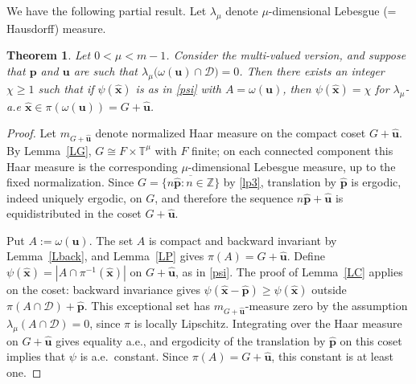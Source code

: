 \documentclass[11pt,reqno,tbtags,a4paper]{amsart}
\numberwithin{equation}{section}
\renewcommand\ge{\geq}
\renewcommand\geq{\geqslant}
\theoremstyle{plain}%
\newtheorem{theorem}{Theorem}[section]
\theoremstyle{definition}
\theoremstyle{remark}
\newcommand{\refL}[1]{Lemma~\ref{#1}}
\newcommand\bigpar[1]{\bigl(#1\bigr)}
\newcommand\punkt{\xperiod}    %
\newcommand{\aex}{a.e\punkt}
\newcommand\bbT{\mathbb T}
\newcommand\bbZ{\mathbb Z}
\newcommand\gl{\lambda}
\newcommand\cD{\mathcal D}
\newcommand\cL{{\omega}}
\newcommand\qw{^{-1}}
\newcommand\vp{\mathbf{p}}
\newcommand\hvp{\hat{\mathbf{p}}}
\newcommand\vu{\mathbf{u}}
\newcommand\hvu{{\hat{\mathbf{u}}}}
\newcommand\hvx{\hat{\mathbf{x}}}
\newcommand\0{{\boldsymbol 0}}
\newcommand\1{{\boldsymbol 1}}
\begin{document}
We have the following partial result.
Let $\gl_\mu$ denote $\mu$-dimensional Lebesgue (= Hausdorff) measure.
\begin{theorem}\label{Tmu}
Let $0<\mu<m-1$.
Consider the multi-valued version, and
  suppose that $\vp$ and $\vu$ are such that
$\gl_\mu\bigpar{\cL(\vu)\cap\cD}=0$.
Then there exists an integer $\chi\ge1$ such that if\/ $\psi(\hvx)$ is as in
\eqref{psi} with $A=\cL(\vu)$, then
$\psi(\hvx)=\chi$ for $\gl_\mu$-\aex{} $\hvx\in \pi(\cL(\vu))=G+\hvu$.
\end{theorem}
\begin{proof}
Let $m_{G+\hvu}$ denote normalized Haar measure on the compact coset
$G+\hvu$.  By \refL{LG}, $G\cong F\times\bbT^\mu$ with $F$ finite; on each
connected component this Haar measure is the corresponding $\mu$-dimensional
Lebesgue measure, up to the fixed normalization.  Since
$G=\overline{\{n\hvp:n\in\bbZ\}}$ by \eqref{lp3}, translation by $\hvp$ is
ergodic, indeed uniquely ergodic, on $G$, and therefore the sequence
$n\hvp+\hvu$ is equidistributed in the coset $G+\hvu$.

Put $A:=\cL(\vu)$.  The set $A$ is compact and backward invariant by
\refL{Lback}, and \refL{LP} gives $\pi(A)=G+\hvu$.  Define
$\psi(\hvx)=|A\cap\pi\qw(\hvx)|$ on $G+\hvu$, as in \eqref{psi}.  The proof of
\refL{LC} applies on the coset: backward invariance gives
$\psi(\hvx-\hvp)\ge\psi(\hvx)$ outside
$\pi(A\cap\cD)+\hvp$.
This exceptional set has $m_{G+\hvu}$-measure zero by the assumption
$\gl_\mu(A\cap\cD)=0$, since $\pi$ is locally Lipschitz.
Integrating over the Haar measure on
$G+\hvu$ gives equality a.e., and ergodicity of the translation by $\hvp$ on
this coset implies that $\psi$ is a.e.\ constant.  Since $\pi(A)=G+\hvu$, this
constant is at least one.
\end{proof}
\end{document}
